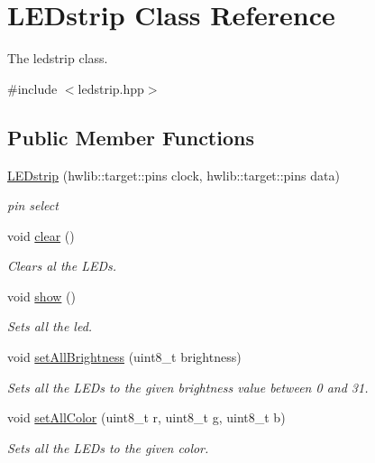 \hypertarget{class_l_e_dstrip}{}\section{L\+E\+Dstrip Class Reference}
\label{class_l_e_dstrip}


The ledstrip class.  




{\ttfamily \#include $<$ledstrip.\+hpp$>$}

\subsection*{Public Member Functions}
\begin{DoxyCompactItemize}
\item 
\hyperlink{class_l_e_dstrip_ab61e240ec69725f220ff443fd0296d42}{L\+E\+Dstrip} (hwlib\+::target\+::pins clock, hwlib\+::target\+::pins data)
\begin{DoxyCompactList}\small\item\em pin select \end{DoxyCompactList}\item 
void \hyperlink{class_l_e_dstrip_a29a03486eed0eeb722908d9145c22003}{clear} ()
\begin{DoxyCompactList}\small\item\em Clears al the L\+E\+Ds. \end{DoxyCompactList}\item 
void \hyperlink{class_l_e_dstrip_a026a5cfb93b103b23764b1eaa957fe3c}{show} ()
\begin{DoxyCompactList}\small\item\em Sets all the led. \end{DoxyCompactList}\item 
void \hyperlink{class_l_e_dstrip_aa8703c4d75730b7ca47f3a97c722973a}{set\+All\+Brightness} (uint8\+\_\+t brightness)
\begin{DoxyCompactList}\small\item\em Sets all the L\+E\+Ds to the given brightness value between 0 and 31. \end{DoxyCompactList}\item 
void \hyperlink{class_l_e_dstrip_a42a90dcca3baf0e2a6e208129761f1b9}{set\+All\+Color} (uint8\+\_\+t r, uint8\+\_\+t g, uint8\+\_\+t b)
\begin{DoxyCompactList}\small\item\em Sets all the L\+E\+Ds to the given color. \end{DoxyCompactList}\item 

\end{DoxyCompactItemize}
